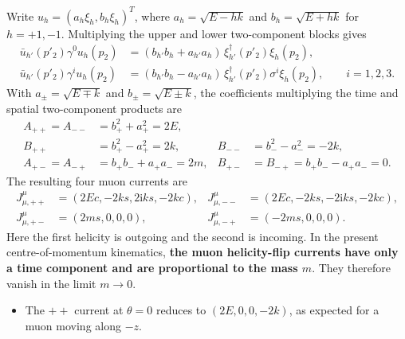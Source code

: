 \documentclass[12pt,a4paper]{article}
\numberwithin{equation}{section}
\newcommand{\ii}{\mathrm i}
\begin{document}
Write
$u_h=(a_h\xi_h,b_h\xi_h)^T$, where
$a_h=\sqrt{E-hk}$ and $b_h=\sqrt{E+hk}$ for $h=+1,-1$. Multiplying the
upper and lower two-component blocks gives
\begin{align}
 \bar u_{h'}(p'_2)\gamma^0u_h(p_2)
 &=(b_{h'}b_h+a_{h'}a_h)\,\xi_{h'}^\dagger(p'_2)\xi_h(p_2),\\
 \bar u_{h'}(p'_2)\gamma^iu_h(p_2)
 &=(b_{h'}b_h-a_{h'}a_h)\,\xi_{h'}^\dagger(p'_2)\sigma^i\xi_h(p_2),
 \qquad i=1,2,3.
\end{align}
With $a_\pm=\sqrt{E\mp k}$ and $b_\pm=\sqrt{E\pm k}$, the coefficients
multiplying the time and spatial two-component products are
\begin{align}
 A_{++}=A_{--}&=b_+^2+a_+^2=2E,\\
 B_{++}&=b_+^2-a_+^2=2k,& B_{--}&=b_-^2-a_-^2=-2k,\\
 A_{+-}=A_{-+}&=b_+b_-+a_+a_-=2m,&
 B_{+-}&=B_{-+}=b_+b_--a_+a_-=0.
\end{align}
The resulting four muon currents are
\begin{equation}
\boxed{\begin{aligned}
 J^\mu_{\mu,++}&=(2Ec,-2ks,2\ii ks,-2kc),&
 J^\mu_{\mu,--}&=(2Ec,-2ks,-2\ii ks,-2kc),\\
 J^\mu_{\mu,+-}&=(2ms,0,0,0),&
 J^\mu_{\mu,-+}&=(-2ms,0,0,0).
\end{aligned}}
 \label{eq:muon-currents}
\end{equation}
Here the first helicity is outgoing and the second is incoming.
In the present centre-of-momentum kinematics, \textbf{the muon helicity-flip
currents have only a time component and are proportional to the mass $m$}.
They therefore vanish in the limit $m\to0$. 
\begin{itemize}
      \item The $++$ current at $\theta=0$ reduces to $(2E,0,0,-2k)$, as expected for a muon moving along $-z$.
\end{itemize}
\end{document}
